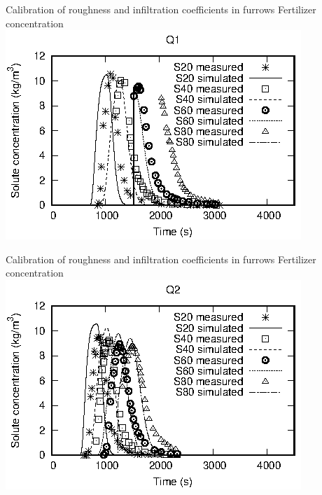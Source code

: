 \documentclass[10pt]{beamer}
\begin{document}
\begin{frame}{Calibration of roughness and infiltration coefficients in furrows}
{Fertilizer concentration}
	\includegraphics[width=\textwidth]{surcos-solute-q1.eps}
\end{frame}

\begin{frame}{Calibration of roughness and infiltration coefficients in furrows}
{Fertilizer concentration}
	\includegraphics[width=\textwidth]{surcos-solute-q2.eps}
\end{frame}
\end{document}
